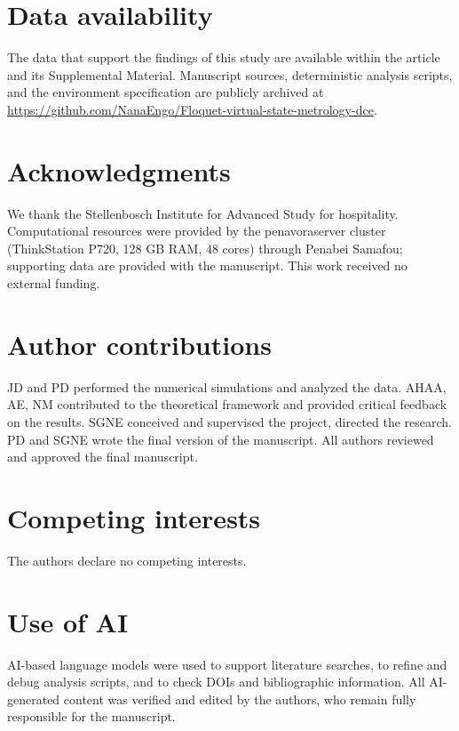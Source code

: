 \documentclass[aps,prxquantum,preprint,superscriptaddress,amsmath,amssymb]{revtex4-2}
\begin{document}
\section*{Data availability}

The data that support the findings of this study are available within the article and its Supplemental Material. Manuscript sources, deterministic analysis scripts, and the environment specification are publicly archived at \url{https://github.com/NanaEngo/Floquet-virtual-state-metrology-dce}.

\section*{Acknowledgments}

We thank the Stellenbosch Institute for Advanced Study for hospitality. Computational resources were provided by the penavoraserver cluster (ThinkStation P720, 128 GB RAM, 48 cores) through Penabei Samafou; supporting data are provided with the manuscript. This work received no external funding.

\section*{Author contributions}

JD and PD performed the numerical simulations and analyzed the data. AHAA, AE, NM contributed to the theoretical framework and provided critical feedback on the results. SGNE conceived and supervised the project, directed the research. PD and SGNE wrote the final version of the manuscript. All authors reviewed and approved the final manuscript.

\section*{Competing interests}

The authors declare no competing interests.

\section*{Use of AI}

AI-based language models were used to support literature searches, to refine and debug analysis scripts, and to check DOIs and bibliographic information. All AI-generated content was verified and edited by the authors, who remain fully responsible for the manuscript.



\end{document}
